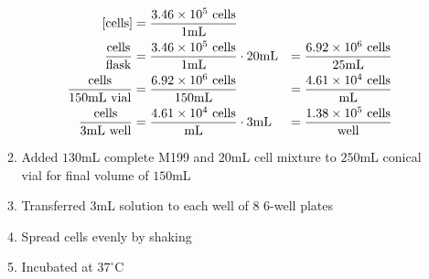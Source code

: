 \begin{enumerate}
\begin{enumerate}
				\begin{align*}
				\text{[cells]} &= \frac{3.46\times 10^{5}\text{ cells}}{1\text{mL}} \\
				\frac{\text{cells}}{\text{flask}} &= \frac{3.46\times 10^{5}\text{ cells}}{1\text{mL}} \cdot 20\text{mL} &= \frac{6.92\times 10^{6}\text{ cells}}{25\text{mL}}\\
				\frac{\text{cells}}{150\text{mL vial}} &= \frac{6.92\times 10^{6}\text{ cells}}{150\text{mL}} &= \frac{4.61\times 10^{4}\text{ cells}}{\text{mL}}\\
				\frac{\text{cells}}{3\text{mL well}} &= \frac{4.61\times 10^{4}\text{ cells}}{\text{mL}} \cdot 3\text{mL} &= \frac{1.38\times 10^{5}\text{ cells}}{\text{well}}\\
				\end{align*}
			\item Added $130$mL complete M199 and $20$mL cell mixture to $250$mL conical vial for final volume of $150$mL
			\item Transferred $3$mL solution to each well of 8 6-well plates
			\item Spread cells evenly by shaking
			\item Incubated at $37^{\circ}$C
		\end{enumerate}

\end{enumerate}


